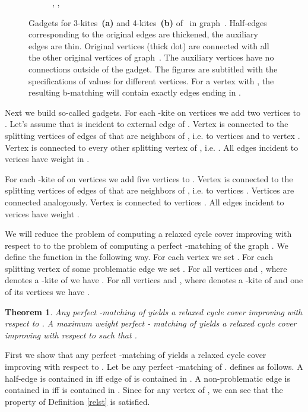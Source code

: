 \documentclass[a4, 11pt]{article}
\newcommand{\dowod}{\noindent{\bf Proof.~}}
\newcommand{\<}{\langle}
\renewcommand{\>}{\rangle}
\newtheorem{theorem}{Theorem}
\begin{document}
\begin{figure}[h!]
\begin{subfigure}{.48\textwidth}
  \caption{, , }
\end{subfigure}

    \caption{Gadgets for 3-kites~\textbf{(a)} and
    4-kites~\textbf{(b)} of~ in graph~. Half-edges corresponding to the
    original edges are thickened, the auxiliary edges are thin. Original
    vertices (thick dot) are connected with all the other original vertices of
    graph~. The auxiliary vertices have no connections outside of the gadget.
    The figures are subtitled with the specifications of  values for
    different vertices. For a vertex  with , the resulting
    b-matching will contain exactly  edges ending in .}
    \label{fig:maxtsp_gadgets}
\end{figure}

Next we build so-called gadgets.
For each -kite  on vertices  we add two vertices  to . Let's assume that  is incident to external edge of .  Vertex  is connected to the splitting vertices of edges of  that are neighbors of , i.e. to vertices  and to vertex .  Vertex  is connected to every other splitting vertex of , i.e. . All edges incident to verices 
have weight  in .

For each -kite of   on vertices     we add five vertices   to .  Vertex  is connected to the splitting vertices of edges of  that are neighbors of , i.e. to vertices .  Vertices  are connected analogously. Vertex  is connected to vertices . All edges incident to verices 
have weight .


We will reduce the problem of computing a relaxed cycle cover improving  with respect to  to the problem of computing a perfect -matching of the graph .
We define the function  in the following way. For each vertex  we set . For each splitting vertex  of some problematic edge we set .
For all  vertices  and , where  denotes a -kite of  we have .
For all  vertices  and , where  denotes a -kite of  and  one of its vertices we have .


\begin{theorem}
Any perfect -matching of  yields  a relaxed cycle cover    improving  with respect to .
A maximum weight perfect - matching of  yields a relaxed cycle cover  improving   with respect to  such that .
\end{theorem}
\dowod  First we  show that any perfect -matching of  yields  a relaxed cycle cover  improving  with respect to .
Let  be any perfect -matching of .  defines   as follows. A half-edge   is contained in  iff edge   of  is contained in . A non-problematic edge  is contained in  iff  is contained in .
Since  for any vertex  of , we can see that  the property  of Definition \ref{relst} is satisfied.
\end{document}
